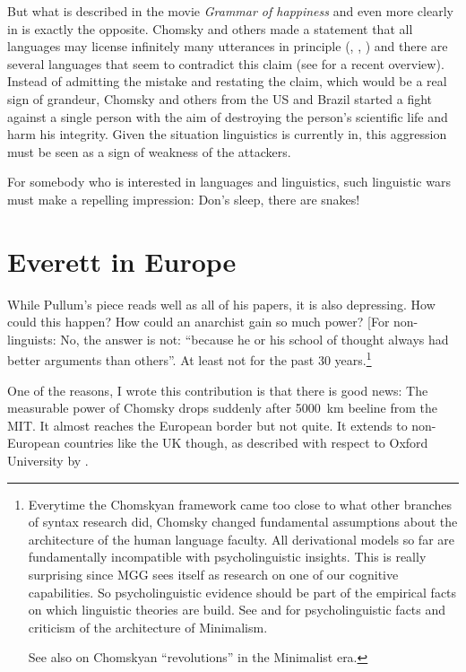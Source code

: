 \documentclass[output=paper,colorlinks,citecolor=brown]{langscibook}
\begin{document}
But what is described in the movie \emph{Grammar of happiness}  and even more clearly
in  is exactly the opposite. Chomsky and others made a statement that all languages may license infinitely
many utterances in principle (\citealt*[]{HCF2002a}, \citealt[]{EH2005a-u}, \citealt*[]{HNG2005a}) and there are several languages that seem to contradict this claim (see
 for a recent overview). Instead of
admitting the mistake and restating the claim, which would be a real sign of grandeur, Chomsky and
others from the US and Brazil started a fight against a single person with the aim of destroying the
person's scientific life and harm his integrity. Given the situation linguistics is currently in,
this aggression must be seen as a sign of weakness of the attackers.

For somebody who is interested in languages and linguistics, such linguistic wars \citep{Harris93a} must make a
repelling impression: Don's sleep, there are snakes!    

\section{Everett in Europe}

While Pullum's piece reads well as all of his papers, it is also depressing. How could this happen?
How could an anarchist gain so much power? [For non-linguists: No, the answer is not: ``because he or
his school of thought always had better arguments than others''. At least not for the past 30
years.\footnote{
Everytime the Chomskyan framework came too close to what other branches of syntax research did,
Chomsky changed fundamental assumptions about the architecture of the human language faculty. All
derivational models so far are fundamentally incompatible with psycholinguistic insights. This is really
surprising since MGG sees itself as research on one of our cognitive capabilities. So
psycholinguistic evidence should be part of the empirical facts on which linguistic theories are
build. See  and \citet{BM2021a} for psycholinguistic facts and criticism of the
architecture of Minimalism.

See also  on Chomskyan ``revolutions'' in the Minimalist era.
}

One of the reasons, I wrote this contribution is that
there is good news: The measurable power of Chomsky drops suddenly after 5000~km beeline from the
MIT. It almost reaches the European border but not quite. It extends to non-European countries like
the UK though, as described with respect to Oxford University by . 
\end{document}

